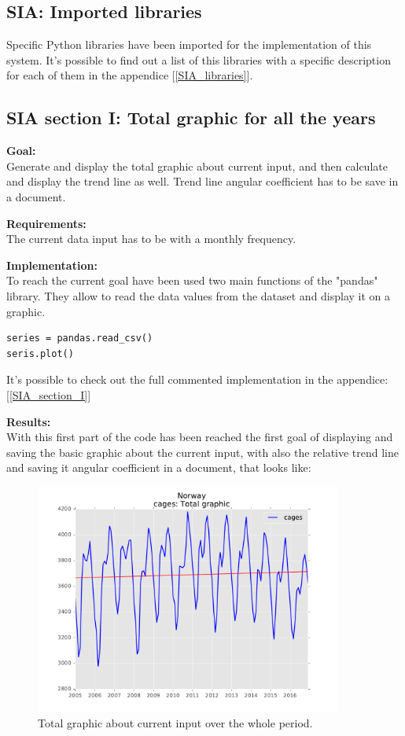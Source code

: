 \subsection{SIA: Imported libraries}
Specific Python libraries have been imported for the implementation of this system.
It's possible to find out a list of this libraries with a specific description for each of them in the appendice [\ref{SIA_libraries}].

\newpage

\subsection{SIA section I: Total graphic for all the years}
\textbf{Goal:}\\
Generate and display the total graphic about current input, and then calculate and display the trend line as well. Trend line angular coefficient has to be save in a document.

\textbf{Requirements:}\\
The current data input has to be with a monthly frequency. 

\textbf{Implementation:}\\
To reach the current goal have been used two main functions of the "pandas" library. They allow to read the data values from the dataset and display it on a graphic.
\begin{lstlisting}
series = pandas.read_csv()
seris.plot()
\end{lstlisting}

It's possible to check out the full commented implementation in the appendice: [\ref{SIA_section_I}]

\textbf{Results:} \\
With this first part of the code has been reached the first goal of displaying and saving the basic graphic about the current input, with also the relative trend line and saving it angular coefficient in a document, that looks like:

\begin{figure}[H]
\includegraphics[width=0.9\textwidth]{Files/Cages_Total.pdf}
\caption{Total graphic about current input over the whole period.}
\end{figure}



